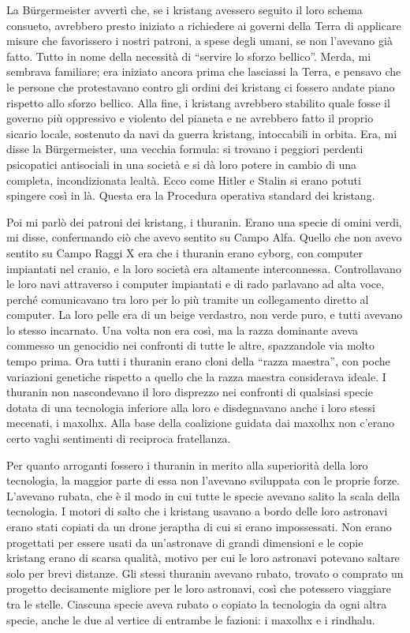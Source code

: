 La Bürgermeister avvertì che, se i kristang avessero seguito il loro
schema consueto, avrebbero presto iniziato a richiedere ai governi della
Terra di applicare misure che favorissero i nostri patroni, a spese
degli umani, se non l'avevano già fatto. Tutto in nome della necessità
di ``servire lo sforzo bellico''. Merda, mi sembrava familiare; era
iniziato ancora prima che lasciassi la Terra, e pensavo che le persone
che protestavano contro gli ordini dei kristang ci fossero andate piano
rispetto allo sforzo bellico. Alla fine, i kristang avrebbero stabilito
quale fosse il governo più oppressivo e violento del pianeta e ne
avrebbero fatto il proprio sicario locale, sostenuto da navi da guerra
kristang, intoccabili in orbita. Era, mi disse la Bürgermeister, una
vecchia formula: si trovano i peggiori perdenti psicopatici antisociali
in una società e si dà loro potere in cambio di una completa,
incondizionata lealtà. Ecco come Hitler e Stalin si erano potuti
spingere così in là. Questa era la Procedura operativa standard dei
kristang.

Poi mi parlò dei patroni dei kristang, i thuranin. Erano una specie di
omini verdi, mi disse, confermando ciò che avevo sentito su Campo Alfa.
Quello che non avevo sentito su Campo Raggi X era che i thuranin erano
cyborg, con computer impiantati nel cranio, e la loro società era
altamente interconnessa. Controllavano le loro navi attraverso i
computer impiantati e di rado parlavano ad alta voce, perché
comunicavano tra loro per lo più tramite un collegamento diretto al
computer. La loro pelle era di un beige verdastro, non verde puro, e
tutti avevano lo stesso incarnato. Una volta non era così, ma la razza
dominante aveva commesso un genocidio nei confronti di tutte le altre,
spazzandole via molto tempo prima. Ora tutti i thuranin erano cloni
della ``razza maestra'', con poche variazioni genetiche rispetto a
quello che la razza maestra considerava ideale. I thuranin non
nascondevano il loro disprezzo nei confronti di qualsiasi specie dotata
di una tecnologia inferiore alla loro e disdegnavano anche i loro stessi
mecenati, i maxolhx. Alla base della coalizione guidata dai maxolhx non
c'erano certo vaghi sentimenti di reciproca fratellanza.

Per quanto arroganti fossero i thuranin in merito alla superiorità della
loro tecnologia, la maggior parte di essa non l'avevano sviluppata con
le proprie forze. L'avevano rubata, che è il modo in cui tutte le specie
avevano salito la scala della tecnologia. I motori di salto che i
kristang usavano a bordo delle loro astronavi erano stati copiati da un
drone jeraptha di cui si erano impossessati. Non erano progettati per
essere usati da un'astronave di grandi dimensioni e le copie kristang
erano di scarsa qualità, motivo per cui le loro astronavi potevano
saltare solo per brevi distanze. Gli stessi thuranin avevano rubato,
trovato o comprato un progetto decisamente migliore per le loro
astronavi, così che potessero viaggiare tra le stelle. Ciascuna specie
aveva rubato o copiato la tecnologia da ogni altra specie, anche le due
al vertice di entrambe le fazioni: i maxolhx e i rindhalu.

